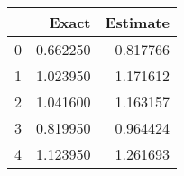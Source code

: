 \begin{tabular}{lrr}
\toprule
 & Exact & Estimate \\
\midrule
0 & 0.662250 & 0.817766 \\
1 & 1.023950 & 1.171612 \\
2 & 1.041600 & 1.163157 \\
3 & 0.819950 & 0.964424 \\
4 & 1.123950 & 1.261693 \\
\bottomrule
\end{tabular}
